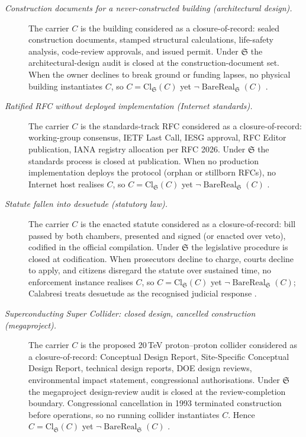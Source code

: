 \documentclass[11pt]{article}
\theoremstyle{definition}
\begin{document}
\begin{description}
\item[\emph{Construction documents for a
never-constructed building (architectural
design).}]
The carrier \(C\) is the building considered as a
closure-of-record: sealed construction documents,
stamped structural calculations, life-safety
analysis, code-review approvals, and issued
permit.  Under \(\mathfrak S\) the
architectural-design audit is closed at the
construction-document set.  When the owner
declines to break
ground or funding lapses, no physical building
instantiates \(C\), so \(C=\mathrm{Cl}_{\mathfrak
S}(C)\) yet \(\neg\operatorname{BareReal}
_{\mathfrak S}(C)\)
\citep{AllenIano2019Fundamentals}.

\item[\emph{Ratified RFC without deployed
implementation (Internet standards).}]
The carrier \(C\) is the standards-track RFC
considered as a closure-of-record: working-group
consensus, IETF Last Call, IESG approval, RFC
Editor publication, IANA registry allocation per
RFC 2026.  Under \(\mathfrak S\) the standards
process is closed at publication.  When no
production implementation deploys the protocol
(orphan or stillborn RFCs), no Internet host
realises \(C\), so \(C=\mathrm{Cl}_{\mathfrak S}
(C)\) yet \(\neg\operatorname{BareReal}_{\mathfrak
S}(C)\) \citep{Bradner1996RFC2026}.

\item[\emph{Statute fallen into desuetude
(statutory law).}]
The carrier \(C\) is the enacted statute
considered as a closure-of-record: bill passed by
both chambers, presented and signed (or enacted
over veto), codified in the official compilation.
Under \(\mathfrak S\) the legislative procedure is
closed at codification.  When prosecutors decline
to charge, courts decline to apply, and citizens
disregard the statute over sustained time, no
enforcement instance realises \(C\), so
\(C=\mathrm{Cl}_{\mathfrak S}(C)\) yet \(\neg
\operatorname{BareReal}_{\mathfrak S}(C)\); Calabresi
treats desuetude as the recognised judicial
response \citep{Calabresi1982Common}.

\item[\emph{Superconducting Super Collider: closed
design, cancelled construction (megaproject).}]
The carrier \(C\) is the proposed 20\,TeV
proton--proton collider considered as a
closure-of-record: Conceptual Design Report,
Site-Specific
Conceptual Design Report, technical design
reports, DOE design reviews, environmental impact
statement, congressional authorisations.  Under
\(\mathfrak S\) the megaproject design-review
audit is closed at the review-completion
boundary.  Congressional cancellation in 1993
terminated construction before operations, so no
running collider instantiates \(C\).  Hence
\(C=\mathrm{Cl}_{\mathfrak S}(C)\) yet
\(\neg\operatorname{BareReal}_{\mathfrak S}(C)\)
\citep{Riordan2015Tunnel}.


\end{description}
\end{document}
